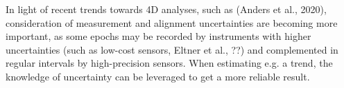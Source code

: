 \documentclass[preprint,12pt,3p]{elsarticle}
\begin{document}
In light of recent trends towards 4D analyses, such as (Anders et al., 2020), consideration of measurement and alignment uncertainties are becoming more important, as some epochs may be recorded by instruments with higher uncertainties (such as low-cost sensors, Eltner et al., ??) and complemented in regular intervals by high-precision sensors. When estimating e.g. a trend, the knowledge of uncertainty can be leveraged to get a more reliable result.















\end{document}
